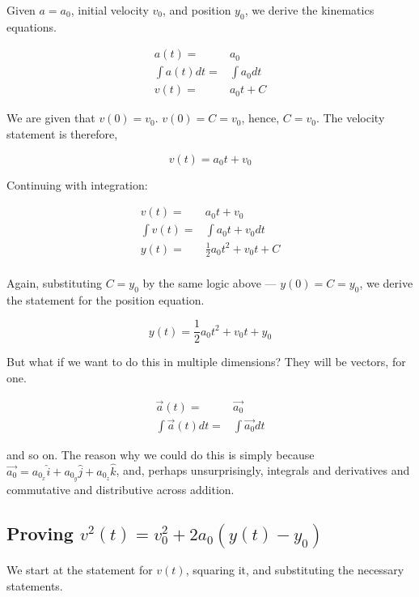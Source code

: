 \documentclass[letterpaper]{article}
\begin{document}
Given \(a=a_0\), initial velocity \(v_0\), and position \(y_0\), we derive the kinematics equations.

\begin{align}
    a(t) =& a_0 \\
    \int a(t) dt =& \int a_0 dt \\
    v(t) =& a_0t + C 
\end{align}

We are given that \(v(0)=v_0\). \(v(0) = C = v_0\), hence, \(C=v_0\). The velocity statement is therefore,

\begin{equation}
    v(t) = a_0t+v_0
\end{equation}

Continuing with integration:

\begin{align}
    v(t) =& a_0t + v_0 \\
    \int v(t) =& \int a_0t + v_0 dt \\
    y(t) =& \frac{1}{2}a_0t^2+v_0t+C \\
\end{align}

Again, substituting \(C = y_0\) by the same logic above --- \(y(0) = C = y_0\), we derive the statement for the position equation.

\begin{equation}
    y(t) = \frac{1}{2}a_0t^2 + v_0t + y_0
\end{equation}

But what if we want to do this in multiple dimensions? They will be vectors, for one.

\begin{align}
    \vec{a}(t) =& \vec{a_0} \\
    \int\vec{a}(t)dt =& \int\vec{a_0} dt
\end{align}

and so on. The reason why we could do this is simply because \(\vec{a_0} = a_0_x \hat{i} + a_0_y\hat{j} + a_0_z\hat{k}\), and, perhaps unsurprisingly, integrals and derivatives and commutative and distributive across addition.

\subsection{Proving \(v^2(t) = v_0^2 + 2a_0(y(t)-y_0)\)}
\label{sec:orgcaa080a}
We start at the statement for \(v(t)\), squaring it, and substituting the necessary statements.
\end{document}
